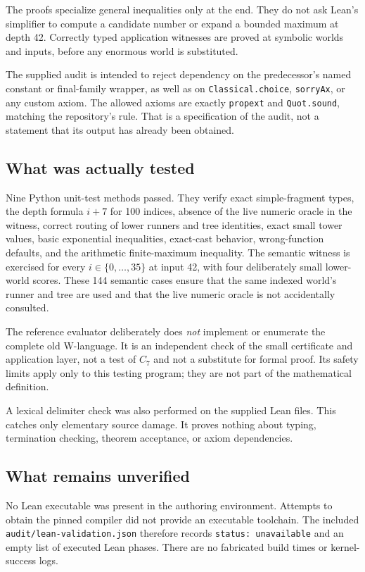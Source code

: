 \documentclass[11pt]{article}
\theoremstyle{definition}
\theoremstyle{remark}
\newcommand{\code}[1]{\texttt{#1}}
\begin{document}
The proofs specialize general inequalities only at the end. They do not ask
Lean's simplifier to compute a candidate number or expand a bounded maximum
at depth 42. Correctly typed application witnesses are proved at symbolic
worlds and inputs, before any enormous world is substituted.

The supplied audit is intended to reject dependency on the predecessor's
named constant or final-family wrapper, as well as on
\code{Classical.choice}, \code{sorryAx}, or any custom axiom. The allowed
axioms are exactly \code{propext} and \code{Quot.sound}, matching the
repository's rule. That is a specification of the audit, not a statement that
its output has already been obtained.

\subsection{What was actually tested}

Nine Python unit-test methods passed. They verify exact simple-fragment types,
the depth formula $i+7$ for 100 indices, absence of the live numeric oracle in
the witness, correct routing of lower runners and tree identities, exact
small tower values, basic exponential inequalities, exact-cast behavior,
wrong-function defaults, and the arithmetic finite-maximum inequality.
The semantic witness is exercised for every $i\in\{0,\ldots,35\}$ at input
42, with four deliberately small lower-world scores. These 144 semantic
cases ensure that the same indexed world's runner and tree are used and that
the live numeric oracle is not accidentally consulted.

The reference evaluator deliberately does \emph{not} implement or enumerate
the complete old W-language. It is an independent check of the small
certificate and application layer, not a test of $C_7$ and not a substitute
for formal proof. Its safety limits apply only to this testing program;
they are not part of the mathematical definition.

A lexical delimiter check was also performed on the supplied Lean files.
This catches only elementary source damage. It proves nothing about typing,
termination checking, theorem acceptance, or axiom dependencies.

\subsection{What remains unverified}

No Lean executable was present in the authoring environment. Attempts to
obtain the pinned compiler did not provide an executable toolchain. The
included \code{audit/lean-validation.json} therefore records
\code{status: unavailable} and an empty list of executed Lean phases.
There are no fabricated build times or kernel-success logs.
\end{document}
